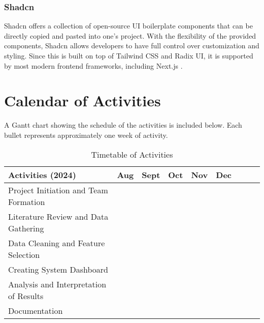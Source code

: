 \subsubsection{Shadcn}
Shadcn offers a collection of open-source UI boilerplate components that can be directly copied and pasted into one's project. With the flexibility of the provided components, Shadcn allows developers to have full control over customization and styling. Since this is built on top of Tailwind CSS and Radix UI, it is supported by most modern frontend frameworks, including Next.js \cite{shadcn-no-date}.

\section{Calendar of Activities}

A Gantt chart showing the schedule of the activities is included below. Each bullet represents approximately one week of activity.

\newcommand{\weekone}{\textbullet}
\newcommand{\weektwo}{\textbullet \textbullet}
\newcommand{\weekthree}{\textbullet \textbullet \textbullet}
\newcommand{\weekfour}{\textbullet \textbullet \textbullet \textbullet}

\begin{table}[ht]
	\centering
	\caption{Timetable of Activities} \vspace{0.25em}
	\begin{tabular}{|p{2in}|c|c|c|c|c|c|c|c|} \hline
		Activities (2024) & Aug & Sept & Oct & Nov & Dec \\ \hline
		Project Initiation and Team Formation & \weektwo & & & & \\ \hline
		Literature Review and Data Gathering & \weektwo & \weekfour & & & \\ \hline
		Data Cleaning and Feature Selection & & \weektwo & & \weekone & \\ \hline
		
		
		Creating System Dashboard & & \weektwo & \weekfour & \weekone & \\ \hline
		Analysis and Interpretation of Results & & & \weekone & & \\ \hline
		Documentation & & \weekone & \weekfour & \weekone & \\ \hline
	\end{tabular}
	\label{tab:timetableactivities}
\end{table}
